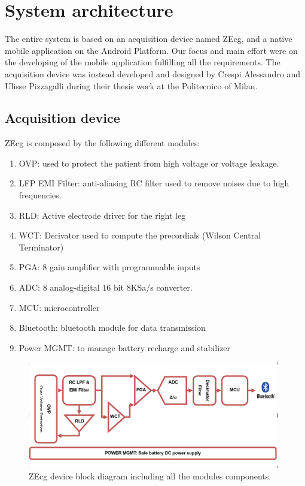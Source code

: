 \chapter{System architecture}
\label{Chapter8}
The entire system is based on an acquisition device named ZEcg, and a native mobile application on the Android Platform. Our focus and main effort were on the developing of the mobile application fulfilling all the requirements. The acquisition device was instead developed and designed by Crespi Alessandro and Ulisse Pizzagalli during their thesis work at the Politecnico of Milan.
\section{Acquisition device}
ZEcg is composed by the following different modules:
\begin{enumerate}
	\item OVP: used to protect the patient from high voltage or voltage leakage.
	\item LFP EMI Filter: anti-aliasing RC filter used to remove noises due to high frequencies.
	\item RLD: Active electrode driver for the right leg
	\item WCT: Derivator used to compute the precordials (Wilson Central Terminator)
	\item PGA: 8 gain amplifier with programmable inputs
	\item ADC: 8 analog-digital 16 bit 8KSa/s converter.
	\item MCU: microcontroller
	\item Bluetooth: bluetooth module for data transmission
	\item Power MGMT: to manage battery recharge and stabilizer
\end{enumerate}
\begin{figure}[ht!]
	\centering
	\includegraphics[width=110mm]{figures/ch8/1.png}
	\caption{ZEcg device block diagram including all the modules components.}
	\label{fig8.1}
\end{figure}
